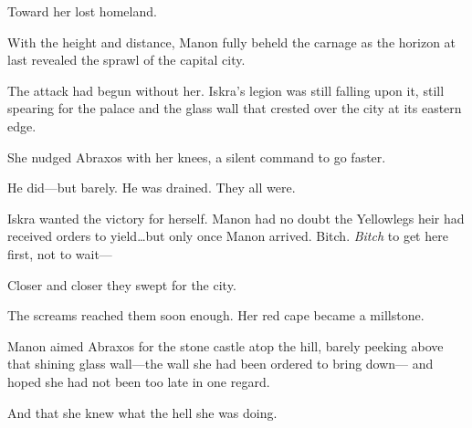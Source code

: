 Toward her lost homeland.

With the height and distance, Manon fully beheld the carnage as the horizon at last revealed the sprawl of the capital city.

The attack had begun without her.
Iskra's legion was still falling upon it, still spearing for the palace and the glass wall that crested over the city at its eastern edge.

She nudged Abraxos with her knees, a silent command to go faster.

He did---but barely.
He was drained.
They all were.

Iskra wanted the victory for herself.
Manon had no doubt the Yellowlegs heir had received orders to yield\ldots but only once Manon arrived.
Bitch.
\emph{Bitch} to get here first, not to wait---

Closer and closer they swept for the city.

The screams reached them soon enough.
Her red cape became a millstone.

Manon aimed Abraxos for the stone castle atop the hill, barely peeking above that shining glass wall---the wall she had been ordered to bring down--- and hoped she had not been too late in one regard.

And that she knew what the hell she was doing.
